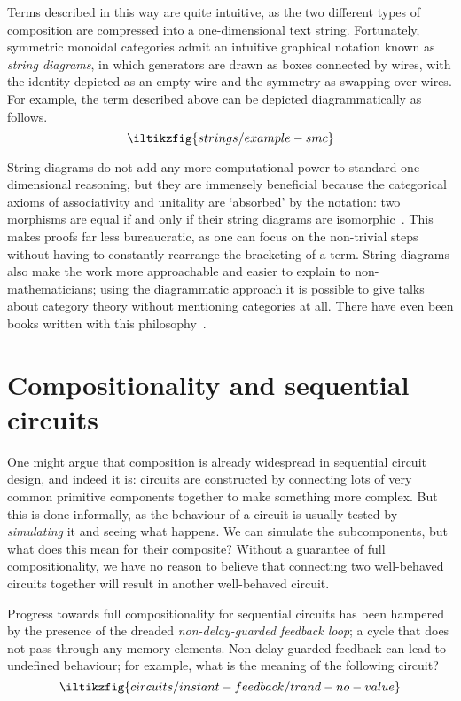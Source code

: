 Terms described in this way are quite intuitive, as the two different types of
composition are compressed into a one-dimensional text string.
Fortunately, symmetric monoidal categories admit an intuitive graphical notation
known as \emph{string diagrams}, in which generators are drawn as boxes
connected by wires, with the identity depicted as an empty wire and the symmetry
as swapping over wires.
For example, the term described above can be depicted diagrammatically as
follows.
\[
    \iltikzfig{strings/example-smc}
\]

String diagrams do not add any more computational power to
standard one-dimensional reasoning, but they are
immensely beneficial because the categorical axioms of associativity and
unitality are `absorbed' by the notation: two morphisms are equal if and only if
their string diagrams are isomorphic~\cite{kelly1980coherence,kissinger2014abstract}.
This makes proofs far less bureaucratic, as one can focus on the non-trivial
steps without having to constantly rearrange the bracketing of a term.
String diagrams also make the work more approachable and easier to explain to
non-mathematicians; using the diagrammatic approach it is possible to give talks
about category theory without mentioning categories at all.
There have even been books written with this
philosophy~\cite{coecke2018picturing}.


\section{Compositionality and sequential circuits}

One might argue that composition is already widespread in sequential circuit
design, and indeed it is: circuits are constructed by connecting lots of very
common primitive components together to make something more complex.
But this is done informally, as the behaviour of a circuit is usually tested
by \emph{simulating} it and seeing what happens.
We can simulate the subcomponents, but what does this mean for their composite?
Without a guarantee of full compositionality, we have no reason to
believe that connecting two well-behaved circuits together will result in
another well-behaved circuit.

Progress towards full compositionality for sequential circuits has been hampered
by the presence of the dreaded \emph{non-delay-guarded feedback loop}; a cycle
that does not pass through any memory elements.
Non-delay-guarded feedback can lead to undefined behaviour; for example, what is
the meaning of the following circuit?
\[
    \iltikzfig{circuits/instant-feedback/trand-no-value}
\]

